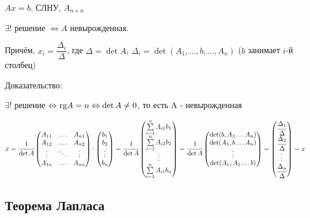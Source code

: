\(Ax = b\). СЛНУ, \(A_{n\times n}\)

\(\exists! \) решение \(\Leftrightarrow A\) невырожденная.

Причём, \(x_i = \dfrac{\Delta_i}{\Delta}\), где \(\Delta = \det A\), \(\Delta_i = \det (A_1, \ldots, b, \ldots, A_n)\) (\(b\) занимает \(i\)-й столбец)


Доказательство:

\(\exists! \) решение \(\Leftrightarrow \rg A = n \Leftrightarrow \det A \neq 0\), то есть A - невырожденная

\(x = \cfrac{1}{\det A} \begin{pmatrix}
    A_{11} & \ldots & A_{n1} \\
    A_{12} & \ldots & A_{n2} \\
    \vdots & \ddots & \vdots \\
    A_{1n} & \ldots & A_{nn} \\
\end{pmatrix} \cdot 
 \begin{pmatrix}
   b_1 \\
   b_2 \\ 
   \vdots \\
   b_n
\end{pmatrix}
 = 
 \cfrac{1}{\det A}
 \begin{pmatrix}
   \sum\limits_{i=1}^n A_{i1}b_1 \\
  \sum\limits_{i=1}^n A_{i2}b_2  \\ 
   \vdots \\
   \sum\limits_{i=1}^n A_{i1}b_n 
\end{pmatrix}
 = 
 \cfrac{1}{\det A}
 \begin{pmatrix}
  \det (b,A_2\ldots A_n) \\
  \det (A_1,b\ldots A_n)  \\ 
   \vdots \\
   \det (A_1,A_2\ldots b)
\end{pmatrix} = 
 \begin{pmatrix}
  \cfrac{\Delta_1}{\Delta}\\
  \cfrac{\Delta_2}{\Delta}  \\ 
   \vdots \\
   \cfrac{\Delta_n}{\Delta}
\end{pmatrix} = x
\)

\subsection{Теорема Лапласа}

